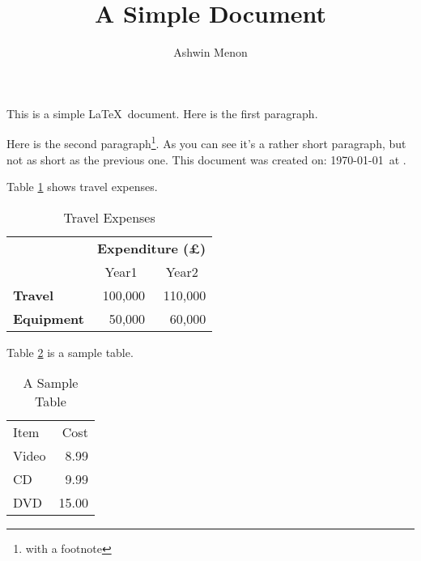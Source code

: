 \documentclass[12pt]{scrbook}
\title{A Simple Document}
\author{Ashwin Menon}
\begin{document}
\maketitle
\frontmatter
\listoftables

\mainmatter
This is a simple \LaTeX\ document. Here is the first paragraph.

Here is the second paragraph\footnote{with a footnote}. As you
can see it's a rather short paragraph, but not as short as the
previous one. This document was created on: \today\ at \currenttime.

Table \ref{tab:travel_expenses} shows travel expenses.
\begin{table}[htbp]
    \caption{Travel Expenses}
    \label{tab:travel_expenses}
    \centering
    \begin{tabular}{lrr}
                        & \multicolumn{2}{c}{\bfseries Expenditure (\pounds)} \\
                        & \multicolumn{1}{c}{Year1} & \multicolumn{1}{c}{Year2} \\
    \bfseries Travel    & 100,000 & 110,000 \\
    \bfseries Equipment & 50,000  & 60,000
    \end{tabular}
\end{table}

Table \ref{tab:sample_table} is a sample table.
\begin{table}[htbp]
    \caption{A Sample Table}
    \label{tab:sample_table}
    \centering
    \begin{tabular}{lr}
        Item  & Cost \\
        Video & 8.99 \\
        CD    & 9.99 \\
        DVD   & 15.00 \\
    \end{tabular}
\end{table}
\end{document}
